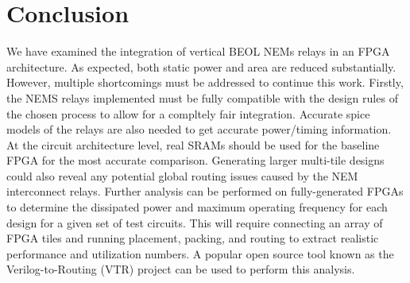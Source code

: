 \documentclass[twoside,twocolumn]{article}
\begin{document}
\section{Conclusion}
We have examined the integration of vertical BEOL NEMs relays in an FPGA architecture. 
As expected, both static power and area are reduced substantially. However, 
multiple shortcomings must be addressed to continue this work. Firstly, the NEMS relays implemented 
must be fully compatible with the design rules of the chosen process to allow for a 
compltely fair integration. Accurate spice models of the relays are also needed 
to get accurate power/timing information. At the circuit architecture level,
real SRAMs should be used for the baseline FPGA for the most accurate comparison. 
Generating larger multi-tile designs could also reveal any potential global 
routing issues caused by the NEM interconnect relays.
Further analysis can be performed on fully-generated FPGAs to determine the dissipated power and maximum 
operating frequency for each design for a given set of test circuits. 
This will require connecting an array of FPGA tiles and running 
placement, packing, and routing to extract realistic performance and
utilization numbers. A popular open source tool known as the Verilog-to-Routing 
(VTR) project \cite{vtr8} can be used to perform this analysis.  



\printbibliography

\end{document}
